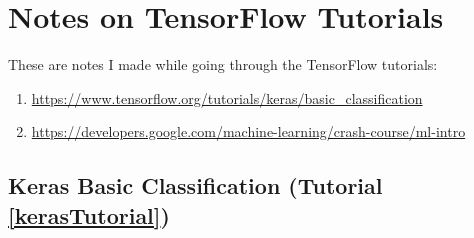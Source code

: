 \chapter{Notes on TensorFlow Tutorials}
These are notes I made while going through the TensorFlow tutorials:
\begin{enumerate} 
	\item
	\url{https://www.tensorflow.org/tutorials/keras/basic_classification}
	\label{kerasTutorial}
	\item 
	\url{https://developers.google.com/machine-learning/crash-course/ml-intro}
	\label{mlTutorial}
\end{enumerate}
\section{Keras Basic Classification (Tutorial \ref{kerasTutorial})}
